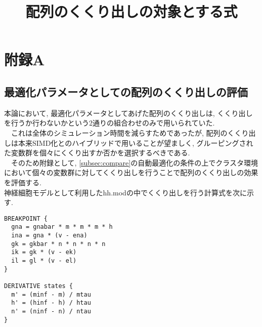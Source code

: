 \section*{附録A}
\subsection*{最適化パラメータとしての配列のくくり出しの評価}
本論において, 最適化パラメータとしてあげた配列のくくり出しは, くくり出しを行うか行わないかという2通りの組合わせのみで用いられていた.\\
　これは全体のシミュレーション時間を減らすためであったが, 配列のくくり出しは本来SIMD化とのハイブリッドで用いることが望ましく, グルーピングされた変数群を個々にくくり出すか否かを選択するべきである.\\
　そのため附録として, \ref{subsec:compare}の自動最適化の条件の上でクラスタ環境において個々の変数群に対してくくり出しを行うことで配列のくくり出しの効果を評価する.\\

  神経細胞モデルとして利用したhh.modの中でくくり出しを行う計算式を次に示す.\\
\begin{table}[htb]
\begin{center}
\title {配列のくくり出しの対象とする式}
{\footnotesize
\begin{framed}
\begin{verbatim}
BREAKPOINT {
  gna = gnabar * m * m * m * h
  ina = gna * (v - ena)
  gk = gkbar * n * n * n * n
  ik = gk * (v - ek)
  il = gl * (v - el)
}

DERIVATIVE states {
  m' = (minf - m) / mtau
  h' = (hinf - h) / htau
  n' = (ninf - n) / ntau
}
\end{verbatim}
\end{framed}
}
\end{center}
\end{table}~\\

